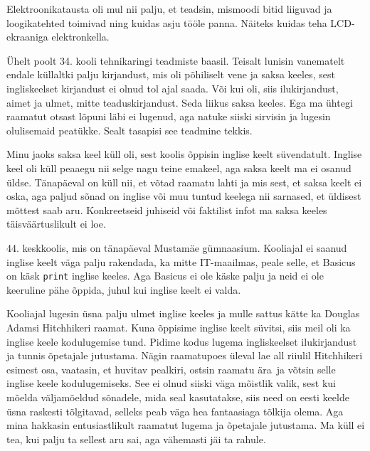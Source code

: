 Elektroonikatausta oli mul nii palju, et teadsin, mismoodi bitid 
liiguvad ja loogikatehted toimivad ning kuidas asju tööle panna. 
Näiteks kuidas teha LCD-ekraaniga elektronkella. 


Ühelt poolt 34. kooli tehnikaringi teadmiste baasil. Teisalt lunisin vanematelt 
endale küllaltki palju kirjandust, mis oli põhiliselt vene ja saksa 
keeles, sest ingliskeelset kirjandust ei olnud tol ajal saada. Või 
kui oli, siis ilukirjandust, aimet ja ulmet, mitte 
teaduskirjandust. Seda liikus saksa keeles. Ega ma ühtegi
raamatut otsast lõpuni läbi ei lugenud, aga 
natuke siiski sirvisin ja lugesin olulisemaid peatükke. Sealt 
tasapisi see teadmine tekkis.


Minu jaoks saksa keel küll oli, sest koolis õppisin inglise keelt 
süvendatult. Inglise keel oli küll peaaegu nii selge nagu teine emakeel, aga saksa keelt ma ei osanud üldse. 
Tänapäeval on küll nii, et võtad raamatu lahti ja mis sest, et saksa 
keelt ei oska, aga paljud sõnad on inglise või muu tuntud keelega nii sarnased, et üldisest mõttest saab aru. 
Konkreetseid juhiseid või faktilist infot ma saksa keeles 
täisväärtuslikult ei loe. 


44. keskkoolis, mis on tänapäeval Mustamäe 
gümnaasium. Kooliajal ei saanud inglise keelt väga palju rakendada, ka mitte 
IT-maailmas,
peale selle, et Basicus on käsk \verb|print| inglise keeles. Aga 
Basicus ei ole käske palju ja neid ei ole keeruline pähe 
õppida, juhul kui inglise keelt ei valda. 


Kooliajal lugesin üsna palju ulmet inglise keeles ja 
mulle sattus kätte ka Douglas Adamsi Hitchhikeri raamat.
Kuna õppisime inglise keelt süvitsi, siis meil oli ka
inglise keele kodulugemise tund. Pidime kodus lugema ingliskeelset
ilukirjandust ja tunnis õpetajale jutustama. Nägin raamatupoes 
üleval lae all riiulil Hitchhikeri esimest osa, 
vaatasin, et huvitav pealkiri, ostsin raamatu ära ja võtsin selle inglise keele kodulugemiseks. See ei olnud siiski väga mõistlik 
valik, sest kui mõelda väljamõeldud sõnadele, mida seal kasutatakse, siis need on 
eesti keelde üsna raskesti tõlgitavad, selleks peab väga hea fantaasiaga tõlkija 
olema. Aga mina hakkasin entusiastlikult raamatut lugema ja õpetajale jutustama. Ma 
küll ei tea, kui palju ta sellest aru sai, aga vähemasti jäi ta rahule. 

